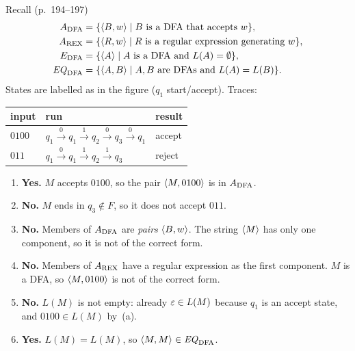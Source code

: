 \begin{soln}
Recall (p.~194--197)
\[
\begin{aligned}
A_{\mathrm{DFA}}&=\{\langle B,w\rangle\mid\text{$B$ is a DFA that accepts $w$}\},\\
A_{\mathrm{REX}}&=\{\langle R,w\rangle\mid\text{$R$ is a regular expression generating $w$}\},\\
E_{\mathrm{DFA}}&=\{\langle A\rangle\mid\text{$A$ is a DFA and $L(A)=\emptyset$}\},\\
\mathit{EQ}_{\mathrm{DFA}}&=\{\langle A,B\rangle\mid\text{$A,B$ are DFAs and $L(A)=L(B)$}\}.
\end{aligned}
\]
States are labelled as in the figure ($q_1$ start/accept). Traces:
\begin{center}
\begin{tabular}{@{}lll@{}}
\toprule
input & run & result \\
\midrule
$0100$ & $q_1\xrightarrow{0}q_1\xrightarrow{1}q_2\xrightarrow{0}q_3\xrightarrow{0}q_1$ & accept \\
$011$  & $q_1\xrightarrow{0}q_1\xrightarrow{1}q_2\xrightarrow{1}q_3$ & reject \\
\bottomrule
\end{tabular}
\end{center}
\begin{enumerate}[label=\alph*.]
\item \textbf{Yes.} $M$ accepts $0100$, so the pair $\langle M,0100\rangle$ is in $A_{\mathrm{DFA}}$.
\item \textbf{No.} $M$ ends in $q_3\notin F$, so it does not accept $011$.
\item \textbf{No.} Members of $A_{\mathrm{DFA}}$ are \emph{pairs} $\langle B,w\rangle$. The string $\langle M\rangle$ has only one component, so it is not of the correct form.
\item \textbf{No.} Members of $A_{\mathrm{REX}}$ have a regular expression as the first component. $M$ is a DFA, so $\langle M,0100\rangle$ is not of the correct form.
\item \textbf{No.} $L(M)$ is not empty: already $\varepsilon\in L(M)$ because $q_1$ is an accept state, and $0100\in L(M)$ by~(a).
\item \textbf{Yes.} $L(M)=L(M)$, so $\langle M,M\rangle\in\mathit{EQ}_{\mathrm{DFA}}$.
\end{enumerate}
\end{soln}


